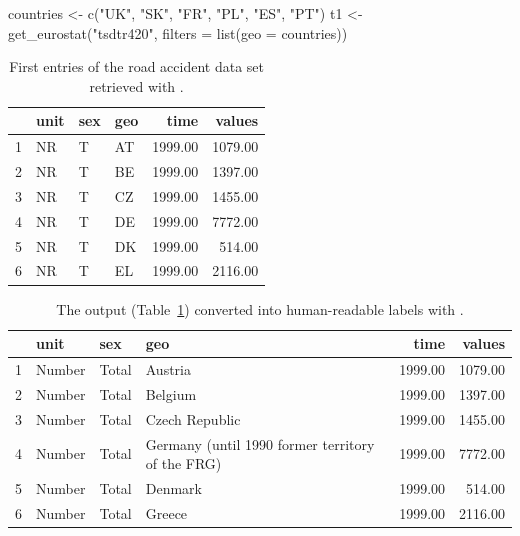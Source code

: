 \begin{example}
  countries <- c("UK", "SK", "FR", "PL", "ES", "PT")
  t1 <- get_eurostat("tsdtr420", filters = list(geo = countries)) 
\end{example}


\begin{table}[ht]
\centering
\begin{tabular}{rlllrr}
\toprule
    & unit & sex & geo & time & values \\ 
  \midrule
  1 & NR & T & AT & 1999.00 & 1079.00 \\ 
  2 & NR & T & BE & 1999.00 & 1397.00 \\ 
  3 & NR & T & CZ & 1999.00 & 1455.00 \\ 
  4 & NR & T & DE & 1999.00 & 7772.00 \\ 
  5 & NR & T & DK & 1999.00 & 514.00 \\ 
  6 & NR & T & EL & 1999.00 & 2116.00 \\ 
\bottomrule   
\end{tabular}
\caption{First entries of the road accident data set retrieved with .}
\label{tab:getdatatable}
\end{table}


\begin{table}[ht]
\centering
\begin{small}
\begin{tabular}{rlllrr}
\toprule
    & unit & sex & geo & time & values \\ 
  \midrule
  1 & Number & Total & Austria & 1999.00 & 1079.00 \\ 
  2 & Number & Total & Belgium & 1999.00 & 1397.00 \\ 
  3 & Number & Total & Czech Republic & 1999.00 & 1455.00 \\ 
  4 & Number & Total & Germany (until 1990 former territory of the FRG) & 1999.00 & 7772.00 \\ 
  5 & Number & Total & Denmark & 1999.00 & 514.00 \\ 
  6 & Number & Total & Greece & 1999.00 & 2116.00 \\ 
\bottomrule      
\end{tabular}
\end{small}
\caption{The  output (Table~\ref{tab:getdatatable}) converted into human-readable labels with .}
\label{tab:getdatatable2}
\end{table}



